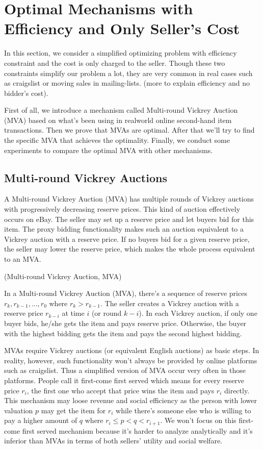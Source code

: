 \section{Optimal Mechanisms with Efficiency and Only Seller's Cost}

In this section, we consider a simplified optimizing problem with efficiency
constraint and the cost is only charged to the seller.  Though these two
constraints simplify our problem a lot, they are very common in real cases such
as craigslist or moving sales in mailing-lists. (more to explain efficiency
and no bidder's cost).

First of all, we introduce a mechanism called Multi-round Vickrey Auction (MVA)
based on what's been using in realworld online second-hand item transactions.
Then we prove that MVAs are optimal. After that we'll try to find the specific
MVA that achieves the optimality. Finally, we conduct some experiments to
compare the optimal MVA with other mechanisms.

\subsection{Multi-round Vickrey Auctions}

A Multi-round Vickrey Auction (MVA) has multiple rounds of Vickrey
auctions with progressively decreasing reserve prices. This kind of auction
effectively occurs on eBay. The seller may set up a reserve price and let
buyers bid for this item. The proxy bidding functionality makes such an auction
equivalent to a Vickrey auction with a reserve price. If no buyers bid for a
given reserve price, the seller may lower the reserve price, which makes the
whole process equivalent to an MVA.

\begin{definition}(Multi-round Vickrey Auction, MVA)

In a Multi-round Vickrey Auction (MVA), there's a sequence of reserve prices
$r_k, r_{k-1}, \ldots, r_0$ where $r_k > r_{k-1}$. The seller creates a Vickrey
auction with a reserve price $r_{k-i}$ at time $i$ (or round $k-i$). In each
Vickrey auction, if only one buyer bids, he/she gets the item and pays reserve
price. Otherwise, the buyer with the highest bidding gets the item and pays the
second highest bidding.

\end{definition}

MVAs require Vickrey auctions (or equivalent English auctions) as basic steps.
In reality, however, such functionality won't always be provided by online
platforms such as craigslist. Thus a simplified version of MVA occur very often
in those platforms. People call it first-come first served which means for
every reserve price $r_i$, the first one who accept that price wins the item
and pays $r_i$ directly. This mechanism may loose revenue and social efficiency
as the person with lower valuation $p$ may get the item for $r_i$ while there's
someone else who is willing to pay a higher amount of $q$ where $r_i \leq p < q
< r_{i+1}$. We won't focus on this first-come first served mechanism because
it's harder to analyze analytically and it's inferior than MVAs in terms of
both sellers' utility and social welfare.

